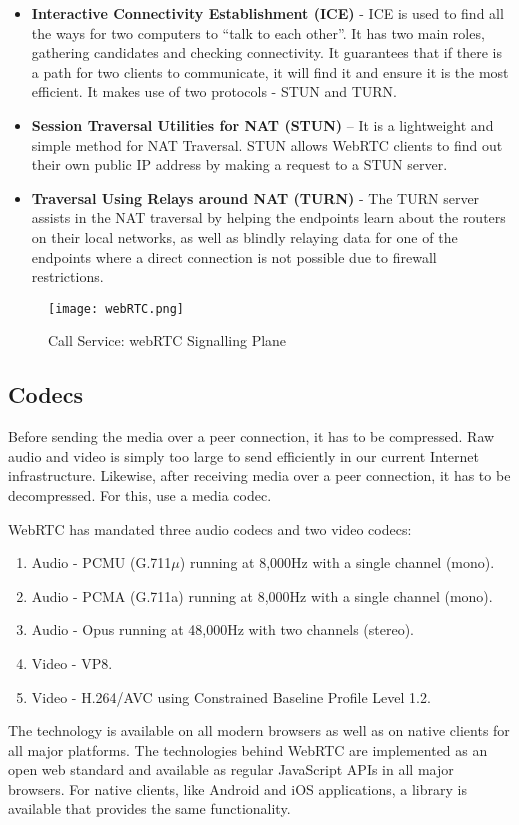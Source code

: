 \begin{itemize}
    \item \textbf{Interactive Connectivity Establishment (ICE)} - ICE is used to find all the ways 
    for two computers to “talk to each other”. It has two main roles, gathering candidates 
    and checking connectivity. It guarantees that if there is a path for two clients to communicate, 
    it will find it and ensure it is the most efficient. It makes use of two protocols - STUN and TURN.
    \item  \textbf{Session Traversal Utilities for NAT (STUN)}  – It is a lightweight and simple 
    method for NAT Traversal. STUN allows WebRTC clients to find out their own public IP address 
    by making a request to a STUN server. 
    \item  \textbf{Traversal Using Relays around NAT (TURN) }  - The TURN server assists in the NAT 
    traversal by helping the endpoints learn about the routers on their local networks, 
    as well as blindly relaying data for one of the endpoints where a direct connection is 
    not possible due to firewall restrictions.
\end{itemize}

\begin{figure}
\begin{center}
    \texttt{[image: webRTC.png]}
\end{center}
\caption{Call Service: webRTC Signalling Plane}
\label{fig:webrtc}
\end{figure}

\subsection{Codecs}

Before sending the media over a peer connection, it has to be compressed. 
Raw audio and video is simply too large to send efficiently in our current Internet infrastructure.
Likewise, after receiving media over a peer connection, it has to be decompressed. 
For this, use a media codec.

WebRTC has mandated three audio codecs and two video codecs:

\begin{enumerate}
    \item Audio - PCMU (G.711$\mu$) running at 8,000Hz with a single channel (mono).
    \item Audio - PCMA (G.711a) running at 8,000Hz with a single channel (mono).
    \item Audio - Opus running at 48,000Hz with two channels (stereo).
    \item Video - VP8.
    \item Video - H.264/AVC using Constrained Baseline Profile Level 1.2.
\end{enumerate} 

The technology is available on all modern browsers as well as on native clients for
all major platforms. The technologies behind WebRTC are implemented as an open web 
standard and available as regular JavaScript APIs in all major browsers. For native clients, 
like Android and iOS applications, a library is available that provides the same 
functionality.~\cite{UltimateGuideWebRTC}

